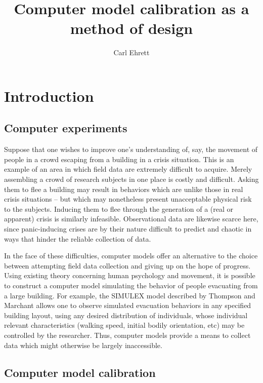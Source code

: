 \documentclass{article}
\author{Carl Ehrett}
\title{Computer model calibration as a method of design}
\begin{document}
\maketitle

\section{Introduction}

\subsection{Computer experiments}

Suppose that one wishes to improve one's understanding of, say, the movement of people in a crowd escaping from a building in a crisis situation. This is an example of an area in which field data are extremely difficult to acquire. Merely assembling a crowd of research subjects in one place is costly and difficult. Asking them to flee a building may result in behaviors which are unlike those in real crisis situations -- but which may nonetheless present unacceptable physical risk to the subjects. Inducing them to flee through the generation of a (real or apparent) crisis is similarly infeasible. Observational data are likewise scarce here, since panic-inducing crises are by their nature difficult to predict and chaotic in ways that hinder the reliable collection of data.

In the face of these difficulties, computer models offer an alternative to the choice between attempting field data collection and giving up on the hope of progress. Using existing theory concerning human psychology and movement, it is possible to construct a computer model simulating the behavior of people evacuating from a large building. For example, the SIMULEX model described by Thompson and Marchant \cite{Thompson1995} allows one to observe simulated evacuation behaviors in any specified building layout, using any desired distribution of individuals, whose individual relevant characteristics (walking speed, initial bodily orientation, etc) may be controlled by the researcher. Thus, computer models provide a means to collect data which might otherwise be largely inaccessible. 


\subsection{Computer model calibration}
\end{document}
